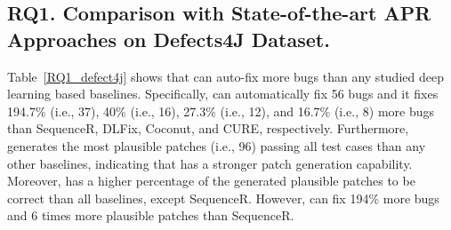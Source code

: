 \subsection{\bf RQ1. Comparison with State-of-the-art APR Approaches on Defects4J Dataset.}

Table~\ref{RQ1_defect4j} shows that {\tool} can auto-fix more bugs than any studied deep learning based baselines. Specifically, {\tool} can automatically fix 56 bugs and it fixes 194.7\% (i.e., 37), 40\% (i.e., 16), 27.3\% (i.e., 12), and 16.7\% (i.e., 8) more bugs than SequenceR, DLFix, Coconut, and CURE, respectively. Furthermore, {\tool} generates the most plausible patches (i.e., 96) passing all test cases than any other baselines, indicating that {\tool} has a stronger patch generation capability. %
Moreover, {\tool} has a higher percentage of the generated plausible patches to be correct than all baselines, except SequenceR. However, {\tool} can fix 194\% more bugs and 6 times more plausible patches than SequenceR.






